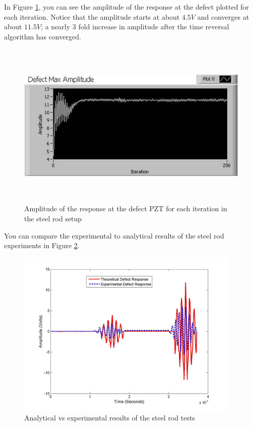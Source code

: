 \documentclass[]{aiaa-tc}%
\begin{document}
In Figure \ref{fig:steel_amps}, you can see the amplitude of the response at the defect plotted for each iteration. Notice that the amplitude starts at about \begin{math}4.5V\end{math} and converges at about \begin{math}11.5V\end{math}; a nearly 3 fold increase in amplitude after the time reversal algorithm has converged.

\begin{figure}[H]%
\centering
 \includegraphics[height = 8cm]{steel_amps}
 \caption{Amplitude of the response at the defect PZT for each iteration in the steel rod setup}
 \label{fig:steel_amps}
\end{figure}

You can compare the experimental to analytical results of the steel rod experiments in Figure \ref{fig:steel_theory_exp}.


\begin{figure}[H]%
\centering
 \includegraphics[height = 8cm]{steel_theory_exp}
 \caption{Analytical vs experimental results of the steel rod tests}
 \label{fig:steel_theory_exp}
\end{figure}
\end{document}
